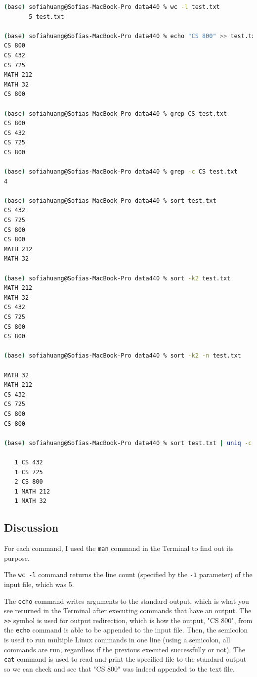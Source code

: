 \documentclass[12pt]{article}
\begin{document}
\begin{lstlisting}[language=bash, caption=Unix commands, label=lst:copy]
(base) sofiahuang@Sofias-MacBook-Pro data440 % wc -l test.txt
       5 test.txt

(base) sofiahuang@Sofias-MacBook-Pro data440 % echo "CS 800" >> test.txt; cat test.txt
CS 800
CS 432
CS 725
MATH 212
MATH 32
CS 800

(base) sofiahuang@Sofias-MacBook-Pro data440 % grep CS test.txt
CS 800
CS 432
CS 725
CS 800

(base) sofiahuang@Sofias-MacBook-Pro data440 % grep -c CS test.txt
4

(base) sofiahuang@Sofias-MacBook-Pro data440 % sort test.txt
CS 432
CS 725
CS 800
CS 800
MATH 212
MATH 32

(base) sofiahuang@Sofias-MacBook-Pro data440 % sort -k2 test.txt
MATH 212
MATH 32
CS 432
CS 725
CS 800
CS 800

(base) sofiahuang@Sofias-MacBook-Pro data440 % sort -k2 -n test.txt

MATH 32
MATH 212
CS 432
CS 725
CS 800
CS 800

(base) sofiahuang@Sofias-MacBook-Pro data440 % sort test.txt | uniq -c

   1 CS 432
   1 CS 725
   2 CS 800
   1 MATH 212
   1 MATH 32
\end{lstlisting}

\subsection*{Discussion}

For each command, I used the \lstinline{man} command in the Terminal to find out its purpose.

The \lstinline{wc -l} command returns the line count (specified by the \lstinline{-1} parameter) of the input file, which was 5. 

The \lstinline{echo} command writes arguments to the standard output, which is what you see returned in the Terminal after executing commands that have an output. The \lstinline{>>} symbol is used for output redirection, which is how the output, "CS 800", from the \lstinline{echo} command is able to be appended to the input file. Then, the semicolon is used to run multiple Linux commands in one line (using a semicolon, all commands are run, regardless if the previous executed successfully or not). The \lstinline{cat} command is used to read and print the specified file to the standard output so we can check and see that "CS 800" was indeed appended to the text file.
\end{document}
